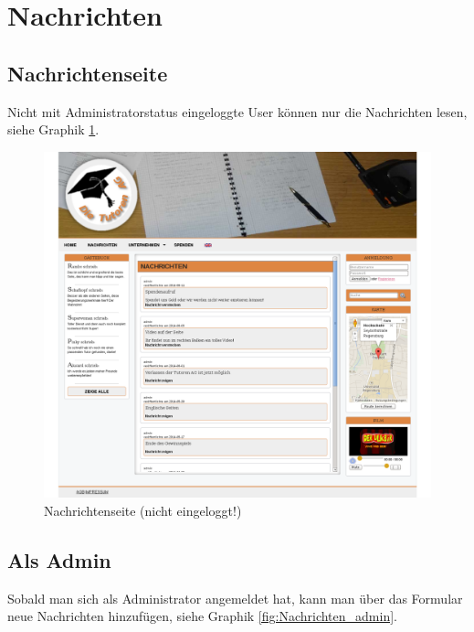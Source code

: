 
\section{Nachrichten}

\subsection{Nachrichtenseite}

Nicht mit Administratorstatus eingeloggte User können nur die Nachrichten lesen, siehe Graphik \ref{fig:Nachrichten}.

\begin{figure}[!htbp]
 \centering
 \includegraphics[width=1\textwidth]{../Screenshots/de/Nachrichten}
 \caption{Nachrichtenseite (nicht eingeloggt!)}
 \label{fig:Nachrichten}
\end{figure}

\newpage

\subsection{Als Admin}

Sobald man sich als Administrator angemeldet hat, kann man über das Formular neue Nachrichten hinzufügen, siehe Graphik \ref{fig:Nachrichten_admin}.

